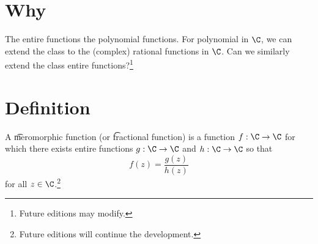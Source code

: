 

\section*{Why}

The entire functions  the polynomial functions.
For polynomial in $\C $, we can extend the class to the (complex) rational functions in $\C $.
Can we similarly extend the class entire functions?\footnote{Future editions may modify.}

\section*{Definition}

A \t{meromorphic function} (or \t{fractional function}) is a function $f: \C  \to \C $ for which there exists entire functions $g: \C  \to \C $ and $h: \C  \to \C $ so that
    \[
f(z) = \frac{g(z)}{h(z)}
    \]
for all $z \in \C $.\footnote{Future editions will continue the development.}

\blankpage